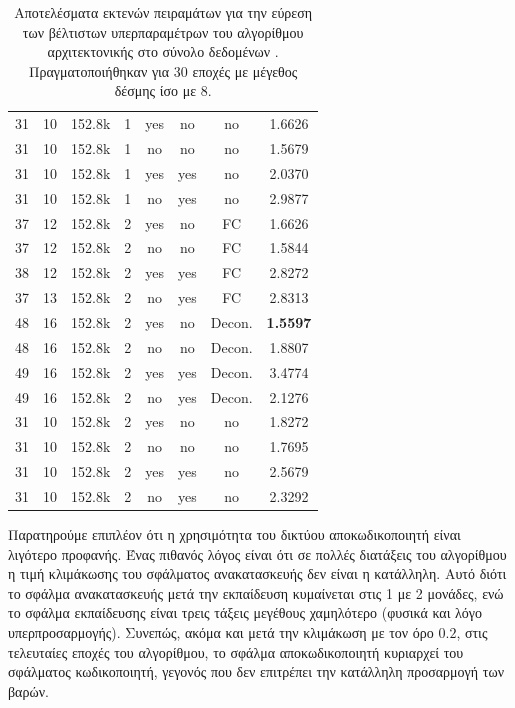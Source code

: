\begin{table}[H]
\begin{center}
{\begin{tabular}{c c c c c c c c}
            31 & 10 & 152.8k & 1 & yes & no & no & 1.6626 \\%
            31 & 10 & 152.8k & 1 & no & no & no & 1.5679 \\%
            31 & 10 & 152.8k & 1 & yes & yes & no & 2.0370 \\
            31 & 10 & 152.8k & 1 & no & yes & no & 2.9877 \\
            \midrule
            37 & 12 & 152.8k & 2 & yes & no & FC & 1.6626\\ %
            37 & 12 & 152.8k & 2 & no & no & FC & 1.5844\\%
            38 & 12 & 152.8k & 2 & yes & yes & FC & 2.8272 \\
            37 & 13 & 152.8k & 2 & no & yes & FC & 2.8313 \\

            48 & 16 & 152.8k & 2 & yes & no & Decon. & \textbf{1.5597} \\ %
            48 & 16 & 152.8k & 2 & no & no & Decon. & 1.8807 \\ %
            49 & 16 & 152.8k & 2 & yes & yes & Decon. & 3.4774 \\
            49 & 16 & 152.8k & 2 & no & yes & Decon. & 2.1276  \\

            31 & 10 & 152.8k & 2 & yes & no & no & 1.8272 \\ %
            31 & 10 & 152.8k & 2 & no & no & no & 1.7695\\ %
            31 & 10 & 152.8k & 2 & yes & yes & no & 2.5679 \\
            31 & 10 & 152.8k & 2 & no & yes & no & 2.3292 \\

            \bottomrule
        \end{tabular}
        }
    \end{center}
    \caption[]{\label{tab:method_3_hyper_tuning_RoWSS}Αποτελέσματα εκτενών πειραμάτων για την εύρεση των βέλτιστων υπερπαραμέτρων του αλγορίθμου  αρχιτεκτονικής  στο σύνολο δεδομένων . Πραγματοποιήθηκαν για 30 εποχές με μέγεθος δέσμης ίσο με 8.} 
\end{table}


Παρατηρούμε επιπλέον ότι η χρησιμότητα του δικτύου αποκωδικοποιητή είναι λιγότερο προφανής. Ένας πιθανός λόγος είναι ότι σε πολλές διατάξεις του αλγορίθμου η τιμή κλιμάκωσης του σφάλματος ανακατασκευής δεν είναι η κατάλληλη. Αυτό διότι το σφάλμα ανακατασκευής μετά την εκπαίδευση κυμαίνεται στις 1 με 2 μονάδες, ενώ το σφάλμα εκπαίδευσης είναι τρεις τάξεις μεγέθους χαμηλότερο (φυσικά και λόγο υπερπροσαρμογής). Συνεπώς, ακόμα και μετά την κλιμάκωση με τον όρο $0.2$, στις τελευταίες εποχές του αλγορίθμου, το σφάλμα αποκωδικοποιητή κυριαρχεί του σφάλματος κωδικοποιητή, γεγονός που δεν επιτρέπει την κατάλληλη προσαρμογή των βαρών.\par


